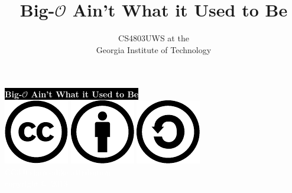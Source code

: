 \documentclass[mathserif,xcolor={dvipsnames,table}]{beamer}
\title{\textbf{Big-$\boldsymbol{\mathcal{O}}$ Ain't What it Used to Be}}
\date{}
\author{CS4803UWS at the\\
Georgia Institute of Technology
}
\begin{document}
{
%
\begin{frame}[plain]
\textcolor{white}{
%
\colorbox{black}{\textbf{Big-$\boldsymbol{\mathcal{O}}$ Ain't What it Used to Be}}
}
\vspace{2.7in}
\\
\hfill\includegraphics[scale=.25]{images/cc-logo.pdf}
\includegraphics[scale=.25]{images/cc-new.pdf}
\includegraphics[scale=.25]{images/cc-share.pdf}
\textcolor{white}{
\\
\hfill \tiny{CC3.0 share-alike attribution}\\
}
\textcolor{white}{
\hfill \scriptsize{copyright \copyright\ 2013}\\
}
\end{frame}
}
\end{document}
